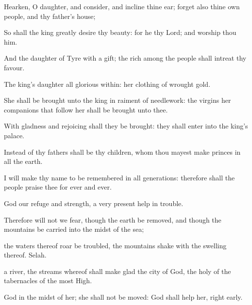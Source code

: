 {\Q {}Hearken, O
daughter, and
consider, and
incline thine
ear;
forget also thine own
people, and thy
father’s
house;


\par }{\Q {}So shall the
king greatly
desire thy
beauty: for he
{} thy
Lord; and
worship thou him.


\par }{\Q {}And the
daughter of
Tyre
{} with a
gift;
{} the
rich among the
people shall
intreat thy
favour.


\par }{\Q {}The
king’s
daughter
{} all
glorious
within: her
clothing
{} of
wrought
gold.


\par }{\Q {}She shall be
brought unto the
king in raiment of
needlework: the
virgins her
companions that
follow her shall be
brought unto thee.


\par }{\Q {}With
gladness and
rejoicing shall they be
brought: they shall
enter into the
king’s
palace.


\par }{\Q {}Instead of thy
fathers shall be thy
children, whom thou mayest
make
princes in all the
earth.


\par }{\Q {}I will make thy
name to be
remembered in
all
generations: therefore shall the
people
praise thee for
ever and
ever.




\par }
{\Q {}God
{} our
refuge and
strength, a
very
present
help in
trouble.


\par }{\Q {}Therefore will not we
fear, though the
earth be
removed, and though the
mountains be
carried into the
midst of the
sea;


\par }{\Q {} the
waters thereof
roar
{} be
troubled,
{} the
mountains
shake with the
swelling thereof.
Selah.


\par }{\Q {} a
river, the
streams whereof shall make
glad the
city of
God, the
holy
{} of the
tabernacles of the most
High.


\par }{\Q {}God
{} in the
midst of her; she shall not be
moved:
God shall
help her,
{}
right
early.


\par }{\BB \par }
